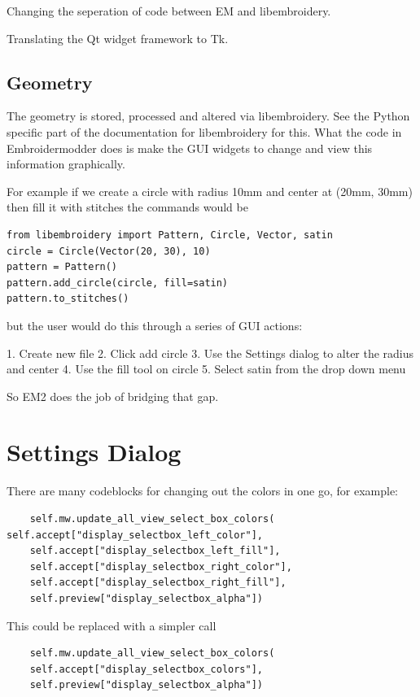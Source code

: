 \documentclass[a4paper]{report}
\begin{document}
Changing the seperation of code between EM and libembroidery.

Translating the Qt widget framework to Tk.

\subsection{Geometry}

The geometry is stored, processed and altered via libembroidery. See the Python
specific part of the documentation for libembroidery for this. What the code in
Embroidermodder does is make the GUI widgets to change and view this information
graphically.

For example if we create a circle with radius 10mm and center at (20mm, 30mm)
then fill it with stitches the commands would be

\begin{lstlisting}
from libembroidery import Pattern, Circle, Vector, satin
circle = Circle(Vector(20, 30), 10)
pattern = Pattern()
pattern.add_circle(circle, fill=satin)
pattern.to_stitches()
\end{lstlisting}

but the user would do this through a series of GUI actions:

1. Create new file
2. Click add circle
3. Use the Settings dialog to alter the radius and center
4. Use the fill tool on circle
5. Select satin from the drop down menu

So EM2 does the job of bridging that gap.

\section{Settings Dialog}

There are many codeblocks for changing out the colors in one go, for example:

\begin{lstlisting}
    self.mw.update_all_view_select_box_colors(    self.accept["display_selectbox_left_color"],
    self.accept["display_selectbox_left_fill"],
    self.accept["display_selectbox_right_color"],
    self.accept["display_selectbox_right_fill"],
    self.preview["display_selectbox_alpha"])
\end{lstlisting}

This could be replaced with a simpler call

\begin{lstlisting}
    self.mw.update_all_view_select_box_colors(
    self.accept["display_selectbox_colors"],
    self.preview["display_selectbox_alpha"])
\end{lstlisting}
\end{document}
